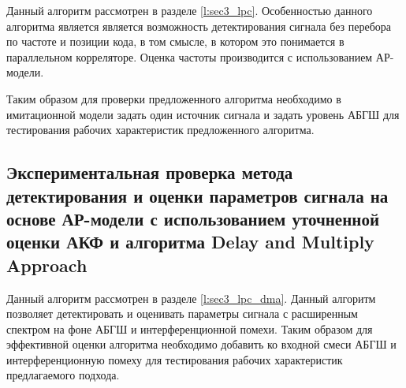 Данный алгоритм рассмотрен в разделе \ref{l:sec3_lpc}. Особенностью данного алгоритма является является возможность детектирования сигнала
без перебора по частоте и позиции кода, в том смысле, в котором это понимается в параллельном корреляторе. Оценка частоты производится с
использованием АР-модели.

Таким образом для проверки предложенного алгоритма необходимо в имитационной модели задать один источник сигнала и задать уровень АБГШ для
тестирования рабочих характеристик предложенного алгоритма.

\subsection{Экспериментальная проверка метода детектирования и оценки параметров сигнала на основе АР-модели с использованием уточненной оценки АКФ
	и алгоритма Delay and Multiply Approach}

Данный алгоритм рассмотрен в разделе \ref{l:sec3_lpc_dma}. Данный алгоритм позволяет детектировать и оценивать параметры сигнала с расширенным спектром
на фоне АБГШ и интерференционной помехи. Таким образом для эффективной оценки алгоритма необходимо добавить ко входной смеси АБГШ и интерференционную помеху
для тестирования рабочих характеристик предлагаемого подхода.

